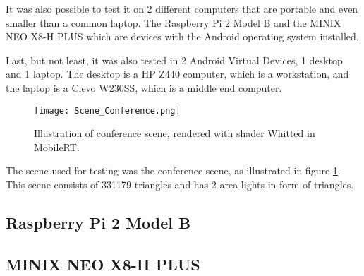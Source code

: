 \par
It was also possible to test it on 2 different computers that are portable and even smaller than a common laptop.
The Raspberry Pi 2 Model B and the MINIX NEO X8-H PLUS which are devices with the Android operating system installed.

\par
Last, but not least, it was also tested in 2 Android Virtual Devices, 1 desktop and 1 laptop.
The desktop is a HP Z440 computer, which is a workstation, and the laptop is a Clevo W230SS, which is a middle end computer.

\begin{figure}[H]
	\centering
	\caption{Illustration of conference scene, rendered with shader Whitted in MobileRT.}
	\label{scene_conference}
	\texttt{[image: Scene\_Conference.png]}
\end{figure}

\par
The scene used for testing was the conference scene, as illustrated in figure \ref{scene_conference}.
This scene consists of 331179 triangles and has 2 area lights in form of triangles.

\subsection{Raspberry Pi 2 Model B}



\subsection{MINIX NEO X8-H PLUS}

